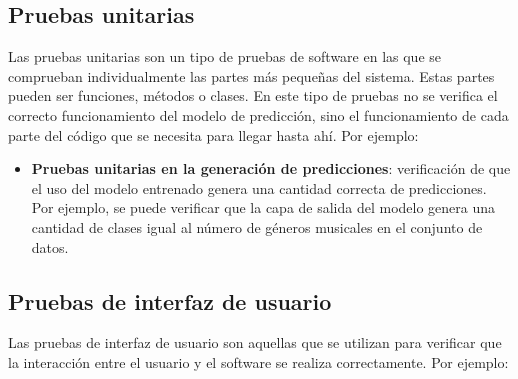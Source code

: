 \subsection{Pruebas unitarias}

Las pruebas unitarias son un tipo de pruebas de software en las que se comprueban individualmente las partes más pequeñas del sistema. Estas partes pueden ser funciones, métodos o clases.
En este tipo de pruebas no se verifica el correcto funcionamiento del modelo de predicción, sino el funcionamiento de cada parte del código que se necesita para llegar hasta ahí. Por ejemplo:

\begin{itemize}
\tightlist

\item \textbf{Pruebas unitarias en la generación de predicciones}: verificación de que el uso del modelo entrenado genera una cantidad correcta de predicciones. Por ejemplo, se puede verificar que la capa de salida del modelo genera una cantidad de clases igual al número de géneros musicales en el conjunto de datos.



\end{itemize}

\subsection{Pruebas de interfaz de usuario}

Las pruebas de interfaz de usuario son aquellas que se utilizan para verificar que la interacción entre el usuario y el software se realiza correctamente. Por ejemplo:

